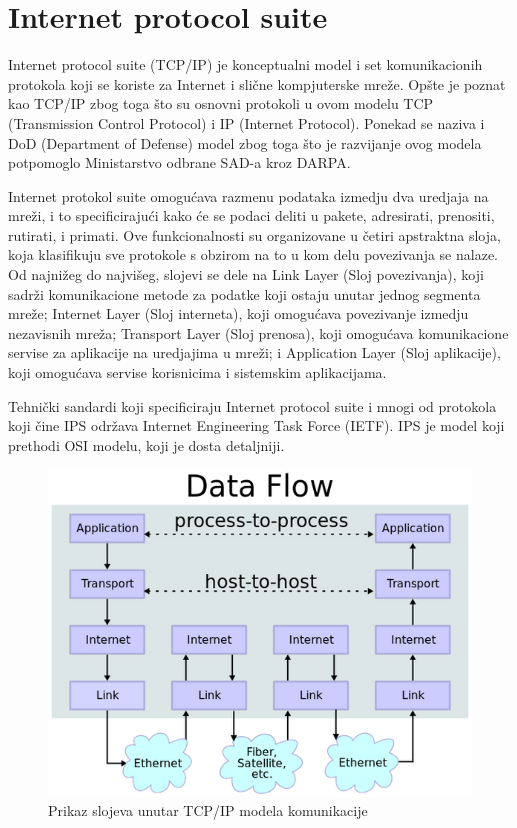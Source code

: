 \documentclass[a4paper,12pt, master]{etf}
\begin{document}
	\section{Internet protocol suite}

	Internet protocol suite (TCP/IP) je konceptualni model i set komunikacionih
	protokola koji se koriste za Internet i sli\v{c}ne kompjuterske mre\v{z}e.
	Op\v{s}te je poznat kao TCP/IP zbog toga \v{s}to su osnovni protokoli u
	ovom modelu TCP (Transmission Control Protocol) i IP (Internet Protocol).
	Ponekad se naziva i DoD (Department of Defense) model zbog toga \v{s}to je
	razvijanje ovog modela potpomoglo Ministarstvo odbrane SAD-a kroz DARPA.

	Internet protokol suite omogu\'{c}ava razmenu podataka izmedju dva uredjaja
    na mre\v{z}i, i to specificiraju\'{c}i kako \'{c}e se podaci deliti u
    pakete, adresirati, prenositi, rutirati, i primati. Ove funkcionalnosti su
    organizovane u \v{c}etiri apstraktna sloja, koja klasifikuju sve protokole
    s obzirom na to u kom delu povezivanja se nalaze. Od najni\v{z}eg do
    najvi\v{s}eg, slojevi se dele na Link Layer (Sloj povezivanja), koji
    sadr\v{z}i komunikacione metode za podatke koji ostaju unutar jednog
    segmenta mre\v{z}e; Internet Layer (Sloj interneta), koji omogu\'{c}ava
    povezivanje izmedju nezavisnih mre\v{z}a; Transport Layer (Sloj prenosa),
    koji omogu\'{c}ava komunikacione servise za aplikacije na uredjajima u
    mre\v{z}i; i Application Layer (Sloj aplikacije), koji omogu\'{c}ava
    servise korisnicima i sistemskim aplikacijama.

	Tehni\v{c}ki sandardi koji specificiraju Internet protocol suite i mnogi od
    protokola koji \v{c}ine IPS odr\v{z}ava Internet Engineering Task Force
    (IETF). IPS je model koji prethodi OSI modelu, koji je dosta detaljniji.

	\begin{figure}[htb]
			\centering
			\includegraphics[scale=.5]{../pic/tcpip_model.png}
			\caption{Prikaz slojeva unutar TCP/IP modela komunikacije}
			\label{fig:tcpip_model}
	\end{figure}
\end{document}
